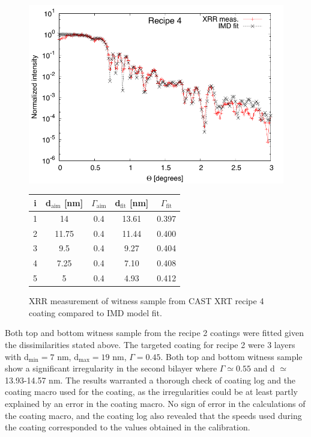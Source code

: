 \begin{figure}[h!]
\centering
\begin{minipage}{.47\textwidth}
  \centering
  \includegraphics[width=\linewidth]{figures/cast/cast_recipe4_fit.pdf}
\end{minipage}%
\begin{minipage}{.53\textwidth}
  \centering
  \footnotesize
\begin{tabular}{c|c|c|c|c}
i&d$_{\text{aim}}$ [nm]&$\Gamma_{\text{aim}}$&d$_{\text{fit}}$ [nm]&$\Gamma_{\text{fit}}$\\
\hline
1&14&0.4&13.61&0.397\\
2&11.75&0.4&11.44&0.400\\
3&9.5&0.4&9.27&0.404\\
4&7.25&0.4&7.10&0.408\\
5&5&0.4&4.93&0.412
\end{tabular}
\end{minipage}
\caption{\footnotesize XRR measurement of witness sample from CAST XRT recipe 4 coating compared to IMD model fit.}\label{fig:cast_fit_rec4}
\end{figure}

Both top and bottom witness sample from the recipe 2 coatings were fitted given the dissimilarities stated above. The targeted coating for recipe 2 were 3 layers with d$_{\text{min}}=7$ nm, d$_{\text{max}}=19$ nm, $\Gamma=0.45$. Both top and bottom witness sample show a significant irregularity in the second bilayer where $\Gamma \simeq 0.55$ and d $\simeq$ 13.93-14.57 nm. The results warranted a thorough check of coating log and the coating macro used for the coating, as the irregularities could be at least partly explained by an error in the coating macro. No sign of error in the calculations of the coating macro, and the coating log also revealed that the speeds used during the coating corresponded to the values obtained in the calibration.


